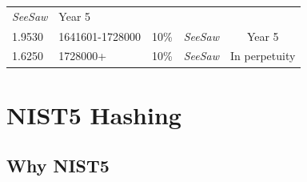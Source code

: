 \documentclass[11pt,a4paperpaper,]{report}
\begin{document}
\begin{longtable}[]{@{}llllc@{}}
\begin{minipage}[t]{0.25\columnwidth}
\textit{SeeSaw}\strut
\end{minipage} & \begin{minipage}[t]{0.12\columnwidth}\centering\strut
Year 5\strut
\end{minipage}\tabularnewline
\begin{minipage}[t]{0.12\columnwidth}\raggedright\strut
1.9530\strut
\end{minipage} & \begin{minipage}[t]{0.19\columnwidth}\raggedright\strut
1641601-1728000\strut
\end{minipage} & \begin{minipage}[t]{0.14\columnwidth}\raggedright\strut
10\%\strut
\end{minipage} & \begin{minipage}[t]{0.25\columnwidth}\raggedright\strut
\textit{SeeSaw}\strut
\end{minipage} & \begin{minipage}[t]{0.12\columnwidth}\centering\strut
Year 5\strut
\end{minipage}\tabularnewline
\begin{minipage}[t]{0.12\columnwidth}\raggedright\strut
1.6250\strut
\end{minipage} & \begin{minipage}[t]{0.19\columnwidth}\raggedright\strut
1728000+\strut
\end{minipage} & \begin{minipage}[t]{0.14\columnwidth}\raggedright\strut
10\%\strut
\end{minipage} & \begin{minipage}[t]{0.25\columnwidth}\raggedright\strut
\textit{SeeSaw}\strut
\end{minipage} & \begin{minipage}[t]{0.12\columnwidth}\centering\strut
In perpetuity\strut
\end{minipage}\tabularnewline
\bottomrule
\end{longtable}

\newpage


\chapter{NIST5 Hashing}\label{nist5-hashing}

\section{Why NIST5}\label{why-nist5}
\end{document}
